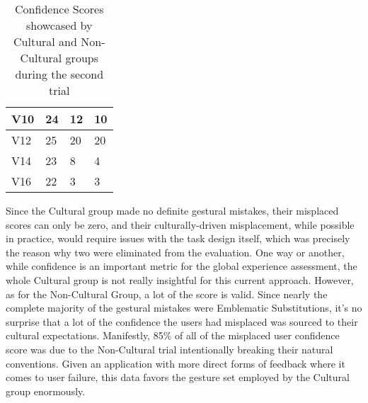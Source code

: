 \begin{table}[ht]
\begin{tabular}{llll}
    \multicolumn{1}{|l|}{V10} & \multicolumn{1}{l|}{24}    & \multicolumn{1}{l|}{12}        & \multicolumn{1}{l|}{10}       \\ \hline
    \multicolumn{1}{|l|}{V12} & \multicolumn{1}{l|}{25}    & \multicolumn{1}{l|}{20}        & \multicolumn{1}{l|}{20}       \\ \hline
    \multicolumn{1}{|l|}{V14} & \multicolumn{1}{l|}{23}    & \multicolumn{1}{l|}{8}         & \multicolumn{1}{l|}{4}        \\ \hline
    \multicolumn{1}{|l|}{V16} & \multicolumn{1}{l|}{22}    & \multicolumn{1}{l|}{3}         & \multicolumn{1}{l|}{3}        \\ \hline
    \end{tabular}
        \caption{\label{tab:Table_Confidence}Confidence Scores showcased by Cultural and Non-Cultural groups during the second trial}
    \end{table}
    
    Since the Cultural group made no definite gestural mistakes, their misplaced scores can only be zero, and their culturally-driven misplacement, while possible in practice, would require issues with the task design itself, which was precisely the reason why two were eliminated from the evaluation. One way or another, while confidence is an important metric for the global experience assessment, the whole Cultural group is not really insightful for this current approach. However, as for the Non-Cultural Group, a lot of the score is valid. Since nearly the complete majority of the gestural mistakes were Emblematic Substitutions, it's no surprise that a lot of the confidence the users had misplaced was sourced to their cultural expectations. Manifestly, 85\% of all of the misplaced user confidence score was due to the Non-Cultural trial intentionally breaking their natural conventions. Given an application with more direct forms of feedback where it comes to user failure, this data favors the gesture set employed by the Cultural group enormously.
    
